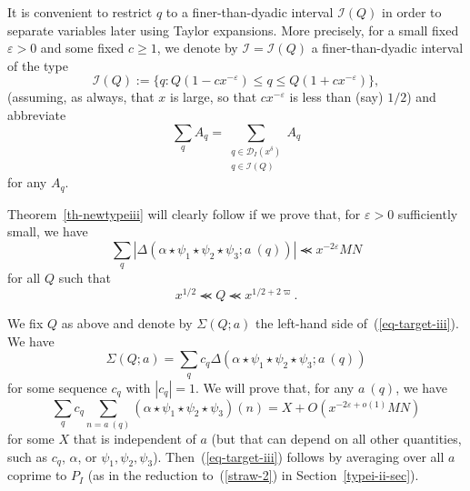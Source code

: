 \documentclass[12pt,a4paper,reqno]{amsart}
\numberwithin{equation}{section}
\theoremstyle{plain}
\theoremstyle{definition}
\newcommand\eps{\varepsilon}
\newcommand{\DIone}[2]{\mathcal{D}_{{#1}}({#2})}
\newcommand{\ftd}{\mathcal{I}}
\renewcommand{\lessapprox}{\llcurly}
\begin{document}
It is convenient to restrict $q$ to a finer-than-dyadic interval $\ftd(Q)$ in order to separate variables later using Taylor
expansions.  More precisely, 
for a small fixed $\eps>0$ and some fixed
$c\geq 1$, we denote by $\ftd=\ftd(Q)$ a finer-than-dyadic
interval of the type
$$
\ftd(Q) := \{ q: Q(1-cx^{-\eps})\leq q\leq Q(1+cx^{- \eps})\},
$$
(assuming, as always, that $x$ is large, so that $c x^{-\eps}$ is less than (say) $1/2$)
and abbreviate
$$ 
\sum_q A_q= \sum_{\substack{q \in \DIone{I}{x^\delta}\\ q
    \in\ftd(Q)}}A_q
$$
for any $A_q$.
\par
Theorem~\ref{th-newtypeiii} will clearly follow if we prove that, for
$\eps>0$ sufficiently small, we have
\begin{equation}\label{eq-target-iii}
  \sum_{q}
  |\Delta(\alpha \star \psi_1 \star \psi_2 \star \psi_3; a\ (q))|
  \lessapprox x^{-2\eps} M N
\end{equation}
for all $Q$ such that
\begin{equation}\label{qp}
 x^{1/2} \lessapprox Q \lessapprox x^{1/2+2\varpi}.
\end{equation}


We fix $Q$ as above and denote by $\Sigma(Q;a)$ the left-hand side
of~(\ref{eq-target-iii}).  We have
$$
\Sigma(Q;a)=\sum_q c_q \Delta(\alpha \star \psi_1 \star \psi_2 \star
\psi_3; a\ (q))
$$ 
for some sequence $c_q$ with $|c_q|=1$. We will prove that, for any
$a\ (q)$, we have
\begin{equation}\label{ton}
  \sum_q c_q \sum_{n = a\ (q)} (\alpha \star \psi_1 \star \psi_2 \star
  \psi_3)(n) 
  = X + O( x^{-2\eps+o(1)} M N  )
\end{equation}
for some $X$ that is independent of $a$ (but that can depend on all other
quantities, such as $c_q$, $\alpha$, or
$\psi_1,\psi_2,\psi_3$). Then~(\ref{eq-target-iii}) follows by
averaging over all $a$ coprime to $P_I$ (as in the reduction
to~(\ref{straw-2}) in Section~\ref{typei-ii-sec}).
\end{document}

